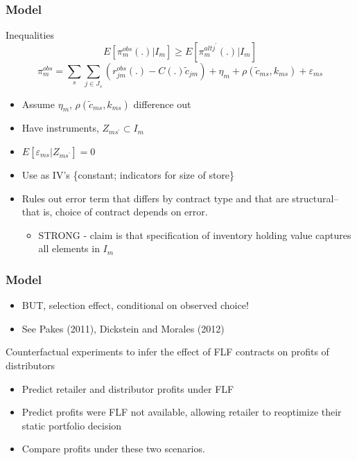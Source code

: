 \begin{frame}
\frametitle{Model}

Inequalities%
\[
E[\pi _{m}^{obs}(.)|I_{m}] \geq E[\pi _{m}^{altj^{\prime }}(.)|I_{m}] 
\]
\[
\pi _{m}^{obs} =\sum_{s}\sum_{j\in J_{s}}(r_{jm}^{obs}(.)-C(.)\widetilde{c}_{jm})+\eta _{m}+\rho (\widetilde{c}_{ms},k_{ms})+\varepsilon _{ms}
\]

\begin{itemize}
\item Assume $\eta _{m}$, $\rho (\widetilde{c}_{ms},k_{ms})$ difference out

\item Have instruments, $Z_{ms^{\prime }}\subset I_{m}$

\item $E[\varepsilon _{ms}|Z_{ms^{\prime }}]=0$

\item Use as IV's \{constant; indicators for size of store\}

\item Rules out error term that differs by contract type and that are
structural--that is, choice of contract depends on error.

\begin{itemize}
\item STRONG - claim is that specification of inventory holding value
captures all elements in $I_{m}$
\end{itemize}
\end{itemize}
\end{frame}


\begin{frame}
\frametitle{Model}

\begin{itemize}
\item BUT, selection effect, conditional on observed choice!

\item See Pakes (2011), Dickstein and Morales (2012)
\end{itemize}

Counterfactual experiments to infer the effect of FLF contracts on profits
of distributors

\begin{itemize}
\item Predict retailer and distributor profits under FLF

\item Predict profits were FLF not available, allowing retailer to
reoptimize their static portfolio decision

\item Compare profits under these two scenarios.
\end{itemize}
\end{frame}

